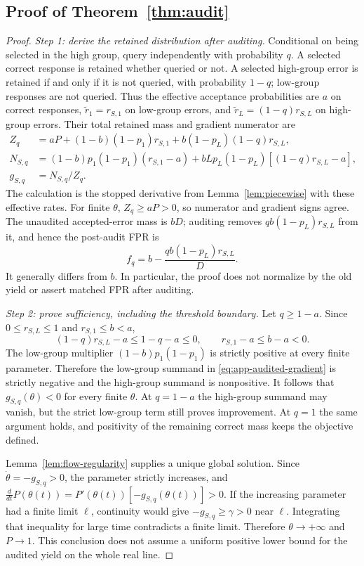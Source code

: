 \subsection{Proof of Theorem~\ref{thm:audit}}
\begin{proof}
\textit{Step 1: derive the retained distribution after auditing.}
Conditional on being selected in the high group, query independently with
probability $q$. A selected correct response is retained whether queried
or not. A selected high-group error is retained if and only if it is not
queried, with probability $1-q$; low-group responses are not queried.
Thus the effective acceptance probabilities are $a$ on correct responses,
$\widetilde r_1=r_{S,1}$ on low-group errors, and
$\widetilde r_L=(1-q)r_{S,L}$ on high-group errors. Their total retained
mass and gradient numerator are
\begin{align}
 Z_q&=aP+(1-b)(1-p_1)r_{S,1}
                   +b(1-p_L)(1-q)r_{S,L},\nonumber\\
 N_{S,q}&=(1-b)p_1(1-p_1)(r_{S,1}-a)
       +bL p_L(1-p_L)[(1-q)r_{S,L}-a],\nonumber\\
 g_{S,q}&=N_{S,q}/Z_q.
 \label{eq:app-audited-gradient}
\end{align}
The calculation is the stopped derivative from Lemma~\ref{lem:piecewise}
with these effective rates. For finite $\theta$, $Z_q\geq aP>0$, so
numerator and gradient signs agree. The unaudited accepted-error mass is
$bD$; auditing removes $qb(1-p_L)r_{S,L}$ from it, and hence the post-audit
FPR is
\[
 f_q=b-\frac{qb(1-p_L)r_{S,L}}{D}.
\]
It generally differs from $b$. In particular, the proof does not normalize
by the old yield or assert matched FPR after auditing.

\textit{Step 2: prove sufficiency, including the threshold boundary.}
Let $q\geq1-a$. Since $0\leq r_{S,L}\leq1$ and
$r_{S,1}\leq b<a$,
\[
 (1-q)r_{S,L}-a\leq1-q-a\leq0,
 \qquad r_{S,1}-a\leq b-a<0.
\]
The low-group multiplier $(1-b)p_1(1-p_1)$ is strictly positive at every
finite parameter. Therefore the low-group summand in
\eqref{eq:app-audited-gradient} is strictly negative and the high-group
summand is nonpositive. It follows that $g_{S,q}(\theta)<0$ for every
finite $\theta$. At $q=1-a$ the high-group summand may vanish, but the
strict low-group term still proves improvement. At $q=1$ the same
argument holds, and positivity of the remaining correct mass keeps the
objective defined.

Lemma~\ref{lem:flow-regularity} supplies a unique global solution.
Since $\dot\theta=-g_{S,q}>0$, the parameter strictly increases, and
$\frac{d}{dt}P(\theta(t))=P'(\theta(t))[-g_{S,q}(\theta(t))]>0$.
If the increasing parameter had a finite limit $\ell$, continuity would
give $-g_{S,q}\geq\gamma>0$ near $\ell$. Integrating that inequality for
large time contradicts a finite limit. Therefore $\theta\to+\infty$
and $P\to1$. This conclusion does not assume a uniform positive lower
bound for the audited yield on the whole real line.


\end{proof}

